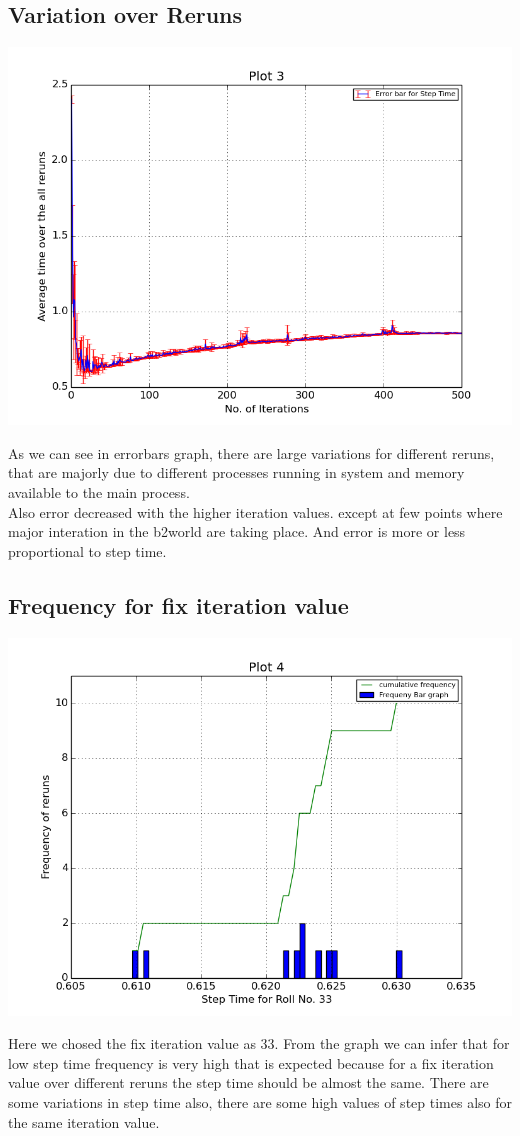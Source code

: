 \documentclass[11pt]{article}
\begin{document}
\subsection{Variation over Reruns}
\begin{center}
\includegraphics[scale=0.5]{g12_plot03}
\end{center}
As we can see in errorbars graph, there are large variations for different reruns, that are majorly due to different processes running in system and memory available to the main process.\\
Also error decreased with the higher iteration values. except at few points where major interation in the b2world are taking place. And error is more or less proportional to step time.
\subsection{Frequency for fix iteration value}
\begin{center}
\includegraphics[scale=0.5]{g12_plot04}
\end{center}
Here we chosed the fix iteration value as 33. From the graph we can infer that for low step time frequency is very high that is expected because for a fix iteration value over different reruns the step time should be almost the same. There are some variations in step time also, there are some high values of step times also for the same iteration value.
\end{document}
